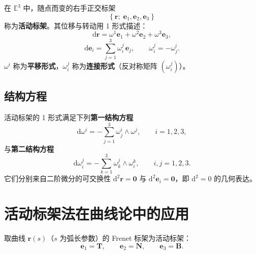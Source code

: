 \begin{definition}[活动标架]
	在 $\mathbb{E}^3$ 中，随点而变的右手正交标架
	\begin{equation}
		\left\{\boldsymbol{r};\;\mathbf{e}_1,\mathbf{e}_2,\mathbf{e}_3\right\}
		\label{eq:活动标架:定义}
	\end{equation}
	称为\textbf{活动标架}。其位移与转动用 1 形式描述：
	\begin{equation}
		\mathrm{d}\boldsymbol{r}=\omega^{1}\mathbf{e}_1+\omega^{2}\mathbf{e}_2+\omega^{3}\mathbf{e}_3,
		\label{eq:活动标架:位移}
	\end{equation}
	\begin{equation}
		\mathrm{d}\mathbf{e}_i=\sum_{j=1}^{3}\omega_{i}^{j}\,\mathbf{e}_j,
		\qquad
		\omega_{i}^{j}=-\omega_{j}^{i}.
		\label{eq:活动标架:转动}
	\end{equation}
	$\omega^{i}$ 称为\textbf{平移形式}，$\omega_{i}^{j}$ 称为\textbf{连接形式}（反对称矩阵 $(\omega_i^j)$）。
\end{definition}

\subsection{结构方程}

\begin{theorem}
	活动标架的 1 形式满足下列\textbf{第一结构方程}
	\begin{equation}
		\mathrm{d}\omega^{i}=-\sum_{j=1}^{3}\omega_{j}^{i}\wedge\omega^{j},
		\qquad i=1,2,3,
		\label{eq:结构方程:第一}
	\end{equation}
	与\textbf{第二结构方程}
	\begin{equation}
		\mathrm{d}\omega_{i}^{j}=-\sum_{k=1}^{3}\omega_{k}^{j}\wedge\omega_{i}^{k},
		\qquad i,j=1,2,3.
		\label{eq:结构方程:第二}
	\end{equation}
	它们分别来自二阶微分的可交换性 $\mathrm{d}^{2}\boldsymbol{r}=\boldsymbol{0}$ 与 $\mathrm{d}^{2}\mathbf{e}_i=\boldsymbol{0}$，即 $\mathrm{d}^{2}=0$ 的几何表达。
	\label{thm:Cartan结构方程}
\end{theorem}

\section{活动标架法在曲线论中的应用}

取曲线 $\boldsymbol{r}(s)$（$s$ 为弧长参数）的 Frenet 标架为活动标架：
\begin{equation}
	\mathbf{e}_1=\mathbf{T},\qquad\mathbf{e}_2=\mathbf{N},\qquad\mathbf{e}_3=\mathbf{B}.
	\label{eq:曲线:活动标架}
\end{equation}

